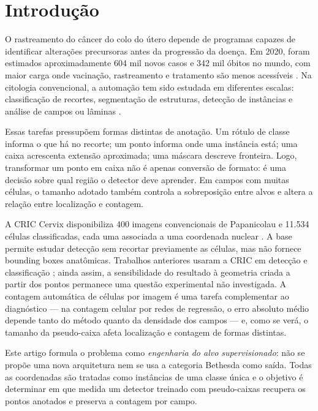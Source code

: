 \section{Introdu\c{c}\~ao}

O rastreamento do c\^ancer do colo do \'utero depende de programas capazes de
identificar altera\c{c}\~oes precursoras antes da progress\~ao da doen\c{c}a. Em
2020, foram estimados aproximadamente 604 mil novos casos e 342 mil \'obitos no
mundo, com maior carga onde vacina\c{c}\~ao, rastreamento e tratamento s\~ao menos
acess\'iveis \cite{singh2023global}. Na citologia convencional, a automa\c{c}\~ao
tem sido estudada em diferentes escalas: classifica\c{c}\~ao de recortes,
segmenta\c{c}\~ao de estruturas, detec\c{c}\~ao de inst\^ancias e an\'alise de campos
ou l\^aminas \cite{jiang2023systematic,fang2024systematic}.

Essas tarefas pressup\~oem formas distintas de anota\c{c}\~ao. Um r\'otulo de
classe informa o que h\'a no recorte; um ponto informa onde uma inst\^ancia est\'a;
uma caixa acrescenta extens\~ao aproximada; uma m\'ascara descreve fronteira.
Logo, transformar um ponto em caixa n\~ao \'e apenas convers\~ao de formato: \'e uma
decis\~ao sobre qual regi\~ao o detector deve aprender. Em campos com muitas
c\'elulas, o tamanho adotado tamb\'em controla a sobreposi\c{c}\~ao entre alvos e
altera a rela\c{c}\~ao entre localiza\c{c}\~ao e contagem.

A CRIC Cervix disponibiliza 400 imagens convencionais de Papanicolau e 11.534
c\'elulas classificadas, cada uma associada a uma coordenada nuclear
\cite{rezende2021cric}. A base permite estudar detec\c{c}\~ao sem recortar
previamente as c\'elulas, mas n\~ao fornece bounding boxes anat\^omicas. Trabalhos
anteriores usaram a CRIC em detec\c{c}\~ao e classifica\c{c}\~ao
\cite{kalbhor2023cervicell}; ainda assim, a sensibilidade do resultado \`a
geometria criada a partir dos pontos permanece uma quest\~ao experimental
n\~ao investigada. A contagem autom\'atica de c\'elulas por imagem \'e uma tarefa
complementar ao diagn\'ostico --- na contagem celular por redes de regress\~ao,
o erro absoluto m\'edio depende tanto do m\'etodo quanto da densidade dos campos
\cite{xie2018fcrn} --- e, como se ver\'a, o tamanho da pseudo-caixa afeta
localiza\c{c}\~ao e contagem de formas distintas.

Este artigo formula o problema como \emph{engenharia do alvo supervisionado}:
n\~ao se prop\~oe uma nova arquitetura nem se usa a categoria Bethesda como sa\'ida.
Todas as coordenadas s\~ao tratadas como inst\^ancias de uma classe \'unica e o
objetivo \'e determinar em que medida um detector treinado com pseudo-caixas
recupera os pontos anotados e preserva a contagem por campo.

